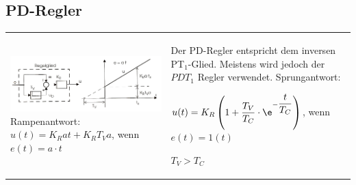     

	\subsection{PD-Regler }
    \begin{tabular}{m{10cm}m{8cm}}
      {
        \includegraphics[width=10cm]{./images/PD_Regler.png}     \newline 
        Rampenantwort: $u(t) = K_R at+K_R T_V a$, wenn $ e(t) = a\cdot t$
      }&
      {
        Der PD-Regler entspricht dem inversen PT$_1$-Glied. Meistens wird jedoch
        der $PDT_1$ Regler verwendet.\newline
        Sprungantwort: \parbox{5cm}{$u(t) = K_R \left(1+\dfrac{T_V}{T_C}\cdot \e^{-\dfrac{t}{T_C}}\right)$, wenn $e(t) = 1(t)$} \newline
         \quad $T_V > T_C$
      }
    \end{tabular}
 

